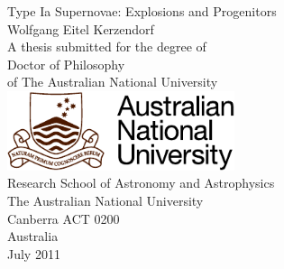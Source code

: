 \documentclass[11pt,openright, pdftex]{report}
\makeatletter
\newcommand{\thesistitle}{Type Ia Supernovae: Explosions and Progenitors}
\newcommand{\fullname}{Wolfgang Eitel Kerzendorf}
\def\cleardoublepage{\clearpage\if@twoside \ifodd\c@page\else
	\hbox{}
	\vspace*{\fill}
	\thispagestyle{empty}
	\newpage
	\if@twocolumn\hbox{}\newpage\fi\fi\fi}
\makeatother
\begin{document}
\pagestyle{empty}

%
%
%
%
\begin{titlepage}\selectfont
  \begin{center}
    \LARGE{\thesistitle}
    \\[2cm]
    \Large{\fullname}
    \\[2cm]
    \normalsize{A thesis submitted for the degree of\\[0.5cm]
      Doctor of Philosophy\\[0.5cm]
      of The Australian National University}
    \\[1.5cm]
    \includegraphics[width=0.5\textwidth]{anu-logo-colour}
    \\[1.5cm]
    \large{Research School of Astronomy and Astrophysics \\[0.25cm]
      The Australian National University \\[0.25cm]
      Canberra ACT 0200 \\[0.25cm]
      Australia}
    \\[2cm]
    \textsf{July 2011}
  \end{center}
\end{titlepage}

%
%
%

%
%
\pagestyle{plain}
\setlength{\parindent}{0pt}
\setlength{\parskip}{1ex plus 0.5ex minus 0.2ex}
%

%

%

%
\tableofcontents\cleardoublepage
\listoffigures\cleardoublepage
\listoftables\cleardoublepage
\end{document}
